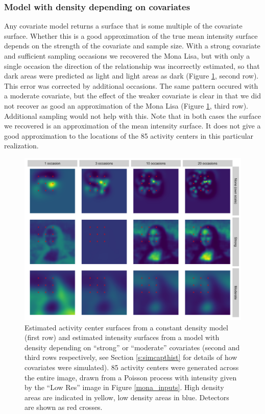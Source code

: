 \documentclass[a4paper,12pt]{article}
\begin{document}
\subsubsection{Model with density depending on covariates}

Any covariate model returns a surface that is some multiple of the covariate surface. Whether this is a good approximation of the true mean intensity surface depends on the strength of the covariate and sample size. With a strong covariate and sufficient sampling occasions we recovered the Mona Lisa, but with only a single occasion the direction of the relationship was incorrectly estimated, so that dark areas were predicted as light and light areas as dark (Figure \ref{peaky}, second row). This error was corrected by additional occasions. The same pattern occured with a moderate covariate, but the effect of the weaker covariate is clear in that we did not recover as good an approximation of the Mona Lisa (Figure \ref{peaky}, third row). Additional sampling would not help with this. Note that in both cases the surface we recovered is an approximation of the mean intensity surface. It does not give a good approximation to the locations of the 85 activity centers in this particular realization.

\begin{figure}[htbp]
\centering
\includegraphics[width=1\textwidth]{mona_peaky}
\caption{Estimated activity center surfaces from a constant density model (first row) and estimated intensity surfaces from a model with density depending on ``strong'' or ``moderate'' covariates (second and third rows respectively, see Section \ref{s:simcapthist} for details of how covariates were simulated). 85 activity centers were generated across the entire image, drawn from a Poisson process with intensity given by the ``Low Res'' image in Figure \ref{mona_inputs}. High density areas are indicated in yellow, low density areas in blue. Detectors are shown as red crosses.}
\label{peaky}
\end{figure}
\end{document}
